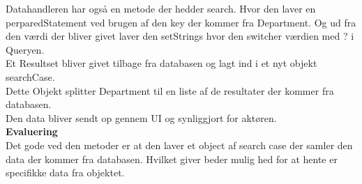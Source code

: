 Datahandleren har også en metode der hedder search. Hvor den laver en perparedStatement ved brugen af den key der kommer fra Department.  Og ud fra den værdi der bliver givet laver den setStrings hvor den switcher værdien med  ?  i Queryen.\\
Et Resultset bliver givet tilbage fra databasen og lagt ind i et nyt objekt searchCase.\\
Dette Objekt splitter Department til en liste af de resultater der kommer fra databasen.\\
Den data bliver sendt op gennem UI og synliggjort for aktøren.\\
\textbf{Evaluering}\\
Det gode ved den metoder er at den laver et object af search case der samler den data der kommer fra databasen. Hvilket giver beder mulig hed for at hente er specifikke data fra objektet. \\
